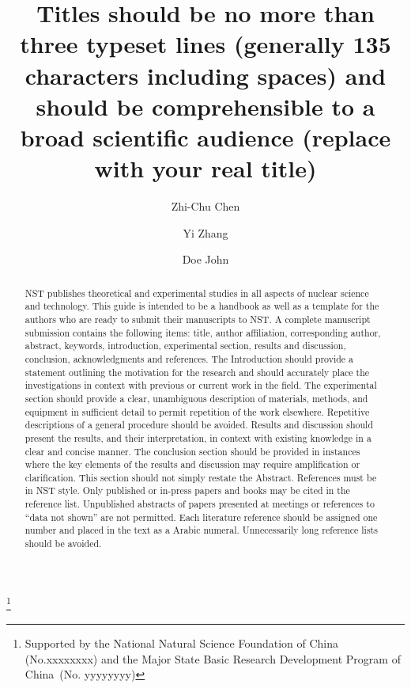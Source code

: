 \documentclass[submitting]{nst}
\begin{document}
\title{Titles should be no more than three typeset lines (generally 135 characters including spaces) and should be comprehensible to a broad scientific audience (replace with your real title)}\thanks{Supported by the National Natural Science Foundation of China (No.xxxxxxxx) and the Major State Basic Research Development Program of China~(No. yyyyyyyy)}

\author{Zhi-Chu Chen}
\author{Yi Zhang}
\author{Doe John}



\begin{abstract}
 NST publishes theoretical and experimental studies in all aspects of nuclear science and technology. This guide is intended to be a handbook as well as a template for the authors who are ready to submit their manuscripts to NST. A complete manuscript submission contains the following items: title, author affiliation, corresponding author, abstract, keywords, introduction, experimental section, results and discussion, conclusion, acknowledgments and references. The Introduction should provide a statement outlining the motivation for the research and should accurately place the investigations in context with previous or current work in the field.  The experimental section should provide a clear, unambiguous description of materials, methods, and equipment in sufficient detail to permit repetition of the work elsewhere. Repetitive descriptions of a general procedure should be avoided. Results and discussion should present the results, and their interpretation, in context with existing knowledge in a clear and concise manner. The conclusion section should be provided in instances where the key elements of the results and discussion may require amplification or clarification. This section should not simply restate the Abstract. References must be in NST style. Only published or in-press papers and books may be cited in the reference list. Unpublished abstracts of papers presented at meetings or references to ``data not shown'' are not permitted. Each literature reference should be assigned one number and placed in the text as a Arabic numeral. Unnecessarily long reference lists should be avoided.
\end{abstract}
\end{document}
